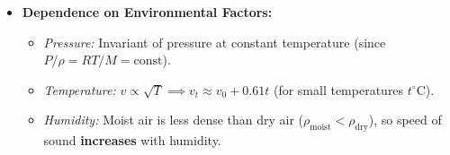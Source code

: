 \documentclass[10pt,twoside,openright]{book}
\begin{document}
\begin{formulabox}
\begin{itemize}
  \item \textbf{Dependence on Environmental Factors:}
  \begin{itemize}
    \item \textit{Pressure:} Invariant of pressure at constant temperature (since $P/\rho = RT/M = \text{const}$).
    \item \textit{Temperature:} $v \propto \sqrt{T} \implies v_t \approx v_0 + 0.61 t$ (for small temperatures $t^\circ\mathrm{C}$).
    \item \textit{Humidity:} Moist air is less dense than dry air ($\rho_{\text{moist}} < \rho_{\text{dry}}$), so speed of sound \textbf{increases} with humidity.
  \end{itemize}
\end{itemize}
\end{formulabox}
\end{document}
